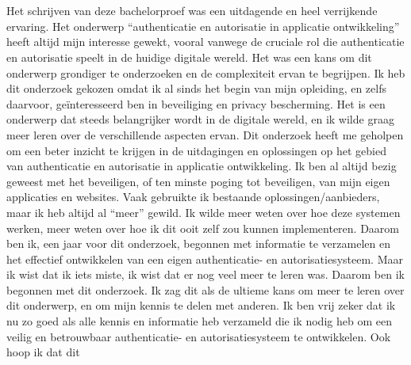 
\chapter*{}%
\label{ch:voorwoord}


Het schrijven van deze bachelorproef was een uitdagende en heel verrijkende ervaring. Het onderwerp ``authenticatie en autorisatie in applicatie ontwikkeling'' heeft altijd mijn interesse gewekt, 
vooral vanwege de cruciale rol die authenticatie en autorisatie speelt in de huidige digitale wereld. Het was een kans om dit onderwerp grondiger te onderzoeken en de complexiteit ervan te begrijpen.
Ik heb dit onderzoek gekozen omdat ik al sinds het begin van mijn opleiding, en zelfs daarvoor, geïnteresseerd ben in beveiliging en privacy bescherming. Het is een onderwerp dat steeds belangrijker wordt 
in de digitale wereld, en ik wilde graag meer leren over de verschillende aspecten ervan. Dit onderzoek heeft me geholpen om een beter inzicht te krijgen in de uitdagingen en oplossingen op het gebied van
authenticatie en autorisatie in applicatie ontwikkeling.
\newline
Ik ben al altijd bezig geweest met het beveiligen, of ten minste poging tot beveiligen, van mijn eigen applicaties en websites. Vaak gebruikte ik bestaande oplossingen/aanbieders, maar ik heb altijd al ``meer'' gewild.
Ik wilde meer weten over hoe deze systemen werken, meer weten over hoe ik dit ooit zelf zou kunnen implementeren. Daarom ben ik, een jaar voor dit onderzoek, begonnen met informatie te verzamelen en
het effectief ontwikkelen van een eigen authenticatie- en autorisatiesysteem. Maar ik wist dat ik iets miste, ik wist dat er nog veel meer te leren was.
\newline
Daarom ben ik begonnen met dit onderzoek. Ik zag dit als de ultieme kans om meer te leren over dit onderwerp, en om mijn kennis te delen met anderen.
Ik ben vrij zeker dat ik nu zo goed als alle kennis en informatie heb verzameld die ik nodig heb om een veilig en betrouwbaar authenticatie- en autorisatiesysteem te ontwikkelen. Ook hoop ik dat dit
